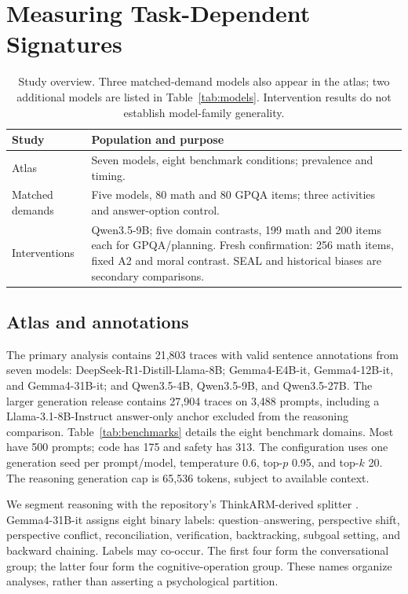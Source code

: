 \section{Measuring Task-Dependent Signatures}
\label{sec:methods}
\begin{table}[t]
\centering\small
\begin{tabularx}{\columnwidth}{@{}lX@{}}
\toprule Study & Population and purpose\\\midrule
Atlas & Seven models, eight benchmark conditions; prevalence and timing.\\
Matched demands & Five models, 80 math and 80 GPQA items; three activities and answer-option control.\\
Interventions & Qwen3.5-9B; five domain contrasts, 199 math and 200 items each for GPQA/planning. Fresh confirmation: 256 math items, fixed A2 and moral contrast. SEAL and historical biases are secondary comparisons.\\
\bottomrule
\end{tabularx}
\caption{Study overview. Three matched-demand models also appear in the atlas; two additional models are listed in Table~\ref{tab:models}. Intervention results do not establish model-family generality.}
\label{tab:overview}
\end{table}
\subsection{Atlas and annotations}
The primary analysis contains 21,803 traces with valid sentence annotations from seven models: DeepSeek-R1-Distill-Llama-8B; Gemma4-E4B-it, Gemma4-12B-it, and Gemma4-31B-it; and Qwen3.5-4B, Qwen3.5-9B, and Qwen3.5-27B. The larger generation release contains 27,904 traces on 3,488 prompts, including a Llama-3.1-8B-Instruct answer-only anchor excluded from the reasoning comparison. Table~\ref{tab:benchmarks} details the eight benchmark domains. Most have 500 prompts; code has 175 and safety has 313. The configuration uses one generation seed per prompt/model, temperature 0.6, top-$p$ 0.95, and top-$k$ 20. The reasoning generation cap is 65,536 tokens, subject to available context.

We segment reasoning with the repository's ThinkARM-derived splitter \citep{li2025thinkarm}. Gemma4-31B-it assigns eight binary labels: question--answering, perspective shift, perspective conflict, reconciliation, verification, backtracking, subgoal setting, and backward chaining. Labels may co-occur. The first four form the conversational group; the latter four form the cognitive-operation group. These names organize analyses, rather than asserting a psychological partition.


